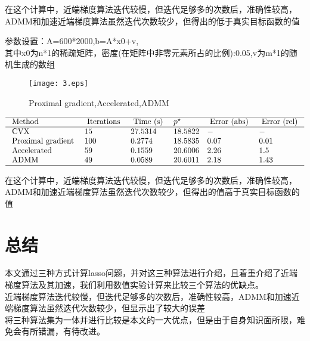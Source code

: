 \documentclass[cn,11pt,chinese,black]{elegantbook}
\begin{document}
\begin{enumerate}
	在这个计算中，近端梯度算法迭代较慢，但迭代足够多的次数后，准确性较高，ADMM和加速近端梯度算法虽然迭代次数较少，但得出的低于真实目标函数的值
\end{enumerate}
\begin{example}
 参数设置：A=600*2000,b=A*x0+v,\\ 其中x0为n*1的稀疏矩阵，密度(在矩阵中非零元素所占的比例):0.05,v为m*1的随机生成的数组
\end{example}
  \begin{figure}[H]
 	\centering
 	\texttt{[image: 3.eps]}
 	\caption{Proximal gradient,Accelerated,ADMM}
 \end{figure}
 $$\begin{array}{llllll}
\hline \text { Method } & \text { Iterations } & \text { Time (s) } & p^{\star} & \text { Error (abs) } & \text { Error (rel) } \\
\hline \text { CVX } & 15 &   27.5314 & 18.5822 & - & - \\
\text { Proximal gradient } & 100 & 0.2774 & 18.5835 & 0.07 & 0.01 \\
\text { Accelerated } &59 & 0.1559 & 20.6006 & 2.26 & 1.5 \\
\text { ADMM } & 49 &  0.0589 & 20.6011 & 2.18 & 1.43 \\
\hline
\end{array}$$
\begin{enumerate}
	在这个计算中，近端梯度算法迭代较慢，但迭代足够多的次数后，准确性较高，ADMM和加速近端梯度算法虽然迭代次数较少，但得出的值高于真实目标函数的值
\end{enumerate}
\section{总结}
\noindent 本文通过三种方式计算lasso问题，并对这三种算法进行介绍，且着重介绍了近端梯度算法及其加速，我们利用数值实验计算来比较三个算法的优缺点。\\
近端梯度算法迭代较慢，但迭代足够多的次数后，准确性较高，ADMM和加速近端梯度算法虽然迭代次数较少，但显示出了较大的误差\\
将三种算法集为一体并进行比较是本文的一大优点，但是由于自身知识面所限，难免会有所错漏，有待改进。
\nocite{*} 


\end{document}
